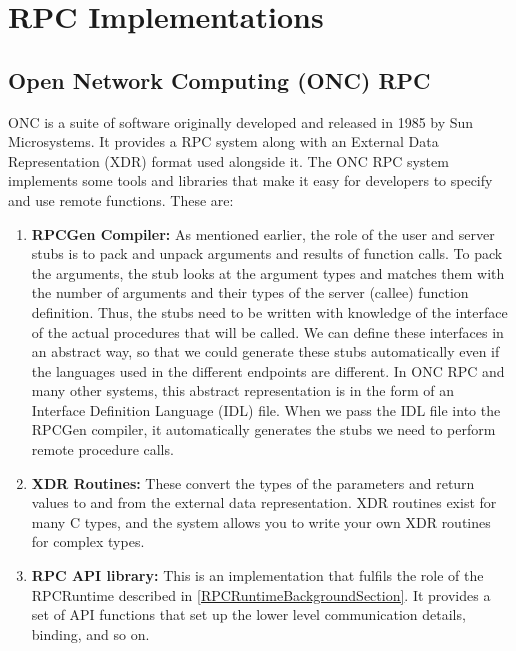 \section{RPC Implementations}


\subsection{Open Network Computing (ONC) RPC}
\label{ONCRPCBackgroundSection} 
ONC is a suite of software originally developed and released in 1985 by Sun Microsystems\cite{stevens2004unix}. It provides a RPC system along with an External Data Representation (XDR) format used alongside it. The ONC RPC system implements some tools and libraries that make it easy for developers to specify and use remote functions. These are:

\begin{enumerate}
	\item \textbf{RPCGen Compiler:} As mentioned earlier, the role of the user and server stubs is to pack and unpack arguments and results of function calls. To pack the arguments, the stub looks at the argument types and matches them with the number of arguments and their types of the server (callee) function definition. Thus, the stubs need to be written with knowledge of the interface of the actual procedures that will be called. We can define these interfaces in an abstract way, so that we could generate these stubs automatically even if the languages used in the different endpoints are different. In ONC RPC and many other systems, this abstract representation is in the form of an Interface Definition Language (IDL) file. When we pass the IDL file into the RPCGen compiler, it automatically generates the stubs we need to perform remote procedure calls.
	\item \textbf{XDR Routines:} These convert the types of the parameters and return values to and from the external data representation. XDR routines exist for many C types, and the system allows you to write your own XDR routines for complex types.
	\item \textbf{RPC API library:} This is an implementation that fulfils the role of the RPCRuntime described in \ref{RPCRuntimeBackgroundSection}. It provides a set of API functions that set up the lower level communication details, binding, and so on.
\end{enumerate}


